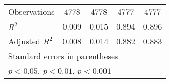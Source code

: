 {\begin{tabular}{l*{4}{c}}
\hline
Observations        &        4778         &        4778         &        4777         &        4777         \\
\(R^{2}\)           &       0.009         &       0.015         &       0.894         &       0.896         \\
Adjusted \(R^{2}\)  &       0.008         &       0.014         &       0.882         &       0.883         \\
\hline\hline
\multicolumn{5}{l}{\footnotesize Standard errors in parentheses}\\
\multicolumn{5}{l}{\footnotesize \sym{*} \(p<0.05\), \sym{**} \(p<0.01\), \sym{***} \(p<0.001\)}\\
\end{tabular}
}
